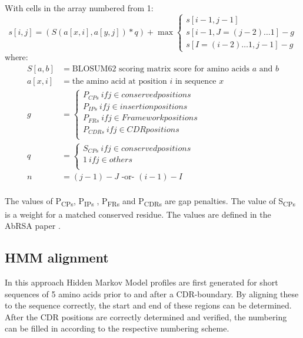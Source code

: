 \noindent With cells in the array numbered from 1:
\begin{equation*}
s[i,j] = (S(a[x,i],a[y,j]) *q) + \max\left\{ \begin{array}{l}
       s[i-1, j-1]\\
       s[i-1, J = (j-2)\ldots 1] - g\\
       s[I = (i-2)\ldots 1, j-1] - g
       \end{array} \right.
\end{equation*}
\noindent where:
\begin{equation*}
  \begin{array}{ll}
    S[a,b] &= \text{BLOSUM62 scoring matrix score for amino acids } a \text{ and } b\\
    a[x,i] &= \text{the amino acid at position } i \text{ in sequence } x \\
    g      &= \left\{ \begin{array}{l}
        P_{CPs}  \ if j \in conserved positions\\
        P_{IPs} \  if j \in insertion positions\\
        P_{FRs} \  if j \in Framework positions\\
        P_{CDRs} \  if j \in CDR positions\\
       \end{array} \right. \\
       
     q      &= \left\{ \begin{array}{l}
        S_{CPs}  \ if j \in conserved positions\\
        1 \  if j \in others\\
        \end{array} \right. \\
        
    n      &= (j-1) - J \text{ -or- } (i-1) - I\\
  \end{array}
\end{equation*}

\clearpage

The  values of P\textsubscript{CPs},  P\textsubscript{IPs} , P\textsubscript{FRs} and P\textsubscript{CDRs} are gap penalties. The value of S\textsubscript{CPs} is a weight for a matched conserved residue. The values are defined in the AbRSA paper \cite{Li2019}.

\subsection{HMM alignment}
In this approach Hidden Markov Model profiles are first generated for short sequences of 5 amino acids prior to and after a CDR-boundary. By aligning these to the sequence correctly, the start and end of these regions can be determined. After the CDR positions are correctly determined and verified, the numbering can be filled in according to the respective numbering scheme. 

